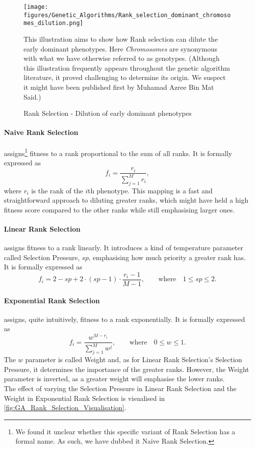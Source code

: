 \begin{figure}[H]
    \centering
    \texttt{[image: figures/Genetic\_Algorithms/Rank\_selection\_dominant\_chromosomes\_dilution.png]}
    \caption{Rank Selection - Dilution of early dominant phenotypes}
    \small
    \raggedright
    This illustration aims to show how Rank selection can dilute the early dominant phenotypes. Here \textit{Chromosomes} are synonymous with what we have otherwise referred to as genotypes. (Although this illustration frequently appears throughout the genetic algorithm literature, it proved challenging to determine its origin. We suspect it might have been published first by Muhamad Azree Bin Mat Said\cite{Rank-Selection-Illustration-Origin}.) 
    \label{fig:GA_Rank_Selection}
\end{figure}

\paragraph{Naive Rank Selection} assigns\footnote{We found it unclear whether this specific variant of Rank Selection has a formal name. As such, we have dubbed it Naive Rank Selection.} fitness to a rank proportional to the sum of all ranks. It is formally expressed as
\begin{equation*}
    f_i = \frac{r_i}{\sum_{j = 1}^M r_i},
\end{equation*}
where $r_i$ is the rank of the $i$th phenotype. This mapping is a fast and straightforward approach to diluting greater ranks, which might have held a high fitness score compared to the other ranks while still emphasising larger ones.

\paragraph{Linear Rank Selection} assigns fitness to a rank linearly. It introduces a kind of temperature parameter called Selection Pressure, $sp$, emphasising how much priority a greater rank has. It is formally expressed as 
\begin{equation*}
    f_i = 2 - sp + 2 \cdot (sp - 1) \cdot \frac{r_i - 1}{M - 1}, \qquad \text{where} \quad 1 \leq sp \leq 2.
\end{equation*}

\paragraph{Exponential Rank Selection} assigns, quite intuitively, fitness to a rank exponentially. It is formally expressed as
\begin{equation*}
    f_i = \frac{w^{M - r_i}}{\sum_{j = 1}^M w^{j}}, \qquad \text{where} \quad 0 \leq w \leq 1.
\end{equation*}
The $w$ parameter is called Weight and, as for Linear Rank Selection's Selection Pressure, it determines the importance of the greater ranks. However, the Weight parameter is inverted, as a greater weight will emphasise the lower ranks.
\\
The effect of varying the Selection Pressure in Linear Rank Selection and the Weight in Exponential Rank Selection is visualised in \autoref{fig:GA_Rank_Selection_Visualisation}.

